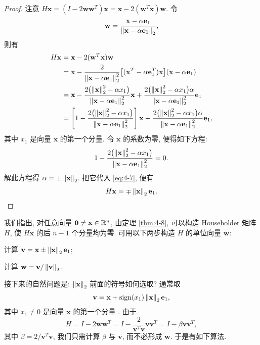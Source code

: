 \begin{proof}
注意 $H\mathbf{x}=(I-2\mathbf{w}\mathbf{w}^T)\mathbf{x}
=\mathbf{x}-2(\mathbf{w}^T\mathbf{x})\mathbf{w}$. 令
\[
  \mathbf{w}=\frac{\mathbf{x}-\alpha\mathbf{e}_1}
  {\left\|\mathbf{x}-\alpha\mathbf{e}_1\right\|_2},
\]
则有
\begin{align}
  H\mathbf{x}&=\mathbf{x}-2(\mathbf{w}^T\mathbf{x})\mathbf{w}\notag\\
  &=\mathbf{x}-\frac{2}{\left\|\mathbf{x}-\alpha\mathbf{e}_1\right\|_2^2}
   \bigl[(\mathbf{x}^T-\alpha\mathbf{e}_1^T)\mathbf{x}\bigr]
   (\mathbf{x}-\alpha\mathbf{e}_1)\notag\\
  &=\mathbf{x}
   -\frac{2\bigl(\left\|\mathbf{x}\right\|_2^2-\alpha x_1\bigr)}
   {\left\|\mathbf{x}-\alpha\mathbf{e}_1\right\|_2^2}\mathbf{x}
   +\frac{2\bigl(\left\|\mathbf{x}\right\|_2^2-\alpha x_1\bigr)\alpha}
   {\left\|\mathbf{x}-\alpha\mathbf{e}_1\right\|_2^2}\mathbf{e}_1\notag\\
  &=\left[1-\frac{2\bigl(\left\|\mathbf{x}\right\|_2^2-\alpha x_1\bigr)}
   {\left\|\mathbf{x}-\alpha\mathbf{e}_1\right\|_2^2}\right]\mathbf{x}
   +\frac{2\bigl(\left\|\mathbf{x}\right\|_2^2-\alpha x_1\bigr)\alpha}
   {\left\|\mathbf{x}-\alpha\mathbf{e}_1\right\|_2^2}\mathbf{e}_1,
   \label{eq:4-7}
\end{align}
其中 $x_1$ 是向量 $\mathbf{x}$ 的第一个分量. 令 $\mathbf{x}$ 的系数为零, 便得如下方程:
\[
  1-\frac{2\bigl(\left\|\mathbf{x}\right\|_2^2-\alpha x_1\bigr)}
  {\left\|\mathbf{x}-\alpha\mathbf{e}_1\right\|_2^2}=0.
\]
解此方程得 $\alpha=\pm\left\|\mathbf{x}\right\|_2$. 把它代入 \eqref{eq:4-7}, 便有
\[
  H\mathbf{x}=\mp\left\|\mathbf{x}\right\|_2\mathbf{e}_1. \qedhere
\]
\end{proof}

我们指出, 对任意向量 $\mathbf{0}\neq\mathbf{x}\in\mathbb{R}^n$, 由定理 \ref{thm:4-8}, 可以构造 Householder 矩阵 $H$, 使 $H\mathbf{x}$ 的后 $n-1$ 个分量均为零. 可用以下两步构造 $H$ 的单位向量 $\mathbf{w}$:
\begin{parenlist}
  \item 计算 $\mathbf{v}=\mathbf{x}\pm\left\|\mathbf{x}\right\|_2\mathbf{e}_1$;
  \item 计算 $\mathbf{w}=\mathbf{v}/\left\|\mathbf{v}\right\|_2$.
\end{parenlist}

接下来的自然问题是: $\left\|\mathbf{x}\right\|_2$ 前面的符号如何选取? 通常取
\[
  \mathbf{v}=\mathbf{x}+\operatorname{sign}(x_1)\left\|\mathbf{x}\right\|_2\mathbf{e}_1,
\]
其中 $x_1\neq0$ 是向量 $\mathbf{x}$ 的第一个分量 \cite{src:80}. 由于
\[
  H=I-2\mathbf{w}\mathbf{w}^T
  =I-\frac{2}{\mathbf{v}^T\mathbf{v}}\mathbf{v}\mathbf{v}^T
  =I-\beta\mathbf{v}\mathbf{v}^T,
\]
其中 $\beta=2/\mathbf{v}^T\mathbf{v}$, 我们只需计算 $\beta$ 与 $\mathbf{v}$, 而不必形成 $\mathbf{w}$. 于是有如下算法.

